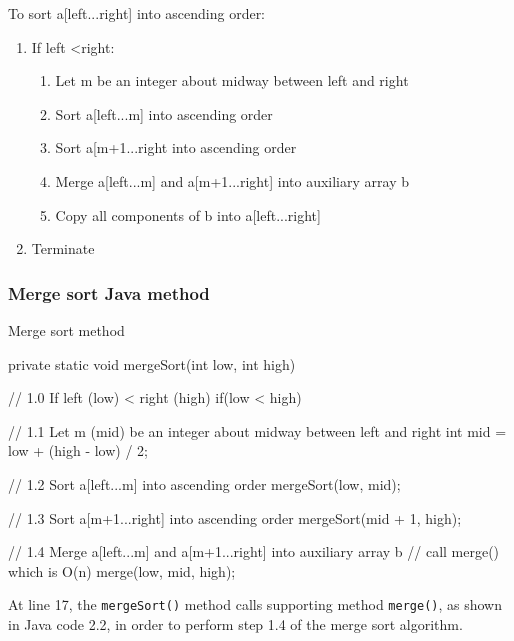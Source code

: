 To sort a[left...right] into ascending order:

\begin{enumerate}
\item If left \textless right:
	\begin{enumerate}
	\item Let m be an integer about midway between left and right
	\item Sort a[left...m] into ascending order
	\item Sort a[m+1...right into ascending order
	\item Merge a[left...m] and a[m+1...right] into auxiliary array b
	\item Copy all components of b into a[left...right]
	\end{enumerate}
\item Terminate
\end{enumerate}

\citep[p. 54]{Watt2001}


\subsubsection{Merge sort Java method}

\begin{listing}[H]
\caption{Merge sort method}
\begin{javacode}
private static void mergeSort(int low, int high) {

    // 1.0 If left (low) < right (high)
    if(low < high) {

        // 1.1 Let m (mid) be an integer about midway between left and right
        int mid = low + (high - low) / 2;

        // 1.2 Sort a[left...m] into ascending order
        mergeSort(low, mid);

        // 1.3 Sort a[m+1...right] into ascending order
        mergeSort(mid + 1, high);

        // 1.4 Merge a[left...m] and a[m+1...right] into auxiliary array b
        // call merge() which is O(n)
        merge(low, mid, high);
    }
}
\end{javacode}
\end{listing}

At line 17, the \texttt{mergeSort()} method calls supporting method \texttt{merge()}, as shown in Java code 2.2, in order to perform step 1.4 of the merge sort algorithm.


